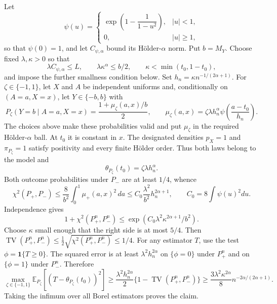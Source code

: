 Let
\[
\psi(u)=
\begin{cases}
\exp\!\left(1-\dfrac{1}{1-u^2}\right),&\lvert u\rvert<1,\\
0,&\lvert u\rvert\ge1,
\end{cases}
\]
so that \(\psi(0)=1\), and let \(C_{\psi,\alpha}\) bound its Hölder-\(\alpha\) norm. Put \(b=M_Y\). Choose fixed \(\lambda,\kappa>0\) so that
\[
\lambda C_{\psi,\alpha}\le L,
\qquad
\lambda\kappa^\alpha\le b/2,
\qquad
\kappa<\min(t_0,1-t_0),
\]
and impose the further smallness condition below. Set \(h_n=\kappa n^{-1/(2\alpha+1)}\). For \(\zeta\in\{-1,1\}\), let \(X\) and \(A\) be independent uniforms and, conditionally on \((A=a,X=x)\), let \(Y\in\{-b,b\}\) with
\[
P_\zeta(Y=b\mid A=a,X=x)
=
\frac{1+\mu_\zeta(a,x)/b}{2},
\qquad
\mu_\zeta(a,x)=\zeta\lambda h_n^\alpha
\psi\!\left(\frac{a-t_0}{h_n}\right).
\]
The choices above make these probabilities valid and put \(\mu_\zeta\) in the required Hölder-\(\alpha\) ball. At \(t_0\) it is constant in \(x\). The designated densities \(p_X=1\) and \(\pi_{P_\zeta}=1\) satisfy positivity and every finite Hölder order. Thus both laws belong to the model and
\[
\theta_{P_\zeta}(t_0)=\zeta\lambda h_n^\alpha.
\]
Both outcome probabilities under \(P_-\) are at least \(1/4\), whence
\[
\chi^2(P_+,P_-)
\le
\frac{8}{b^2}\int_0^1\mu_+(a,x)^2\,da
\le
C_0\frac{\lambda^2}{b^2}h_n^{2\alpha+1},
\qquad
C_0=8\int\psi(u)^2du.
\]
Independence gives
\[
1+\chi^2(P_+^n,P_-^n)
\le
\exp\!\left(C_0\lambda^2\kappa^{2\alpha+1}/b^2\right).
\]
Choose \(\kappa\) small enough that the right side is at most \(5/4\). Then \(\operatorname{TV}(P_+^n,P_-^n)\le\tfrac12\sqrt{\chi^2(P_+^n,P_-^n)}\le1/4\). For any estimator \(T\), use the test \(\phi=\mathbf1\{T\ge0\}\). The squared error is at least \(\lambda^2h_n^{2\alpha}\) on \(\{\phi=0\}\) under \(P_+^n\) and on \(\{\phi=1\}\) under \(P_-^n\). Therefore
\[
\max_{\zeta\in\{-1,1\}}
\mathbb E_{P_\zeta}[(T-\theta_{P_\zeta}(t_0))^2]
\ge
\frac{\lambda^2h_n^{2\alpha}}2
\{1-\operatorname{TV}(P_+^n,P_-^n)\}
\ge
\frac{3\lambda^2\kappa^{2\alpha}}8
n^{-2\alpha/(2\alpha+1)}.
\]
Taking the infimum over all Borel estimators proves the claim.